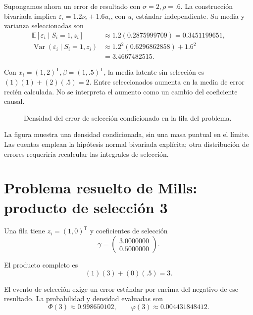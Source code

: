\documentclass[11pt,a4paper]{article}
\newcommand{\E}{\mathbb E}
\newcommand{\T}{^{\mathsf T}}
\DeclareMathOperator{\Var}{Var}
\begin{document}
Supongamos ahora un error de resultado con
\(\sigma=2,\rho=.6\).
La construcción bivariada implica
\(\varepsilon_i=1.2\nu_i+1.6u_i\),
con \(u_i\) estándar independiente.
Su media y varianza seleccionadas son
\[
\begin{aligned}
\E[\varepsilon_i\mid S_i=1,z_i]&\approx1.2(0.2875999709)
=0.3451199651,\\
\Var(\varepsilon_i\mid S_i=1,z_i)&\approx1.2^2(0.6296862858)+1.6^2\\
&=3.4667482515.\end{aligned}
\]

Con \(x_i=(1,2)\T,\beta=(1,.5)\T\),
la media latente sin selección es
\((1)(1)+(2)(.5)=2\).
Entre seleccionados aumenta en
la media de error recién calculada.
No se interpreta el aumento como
un cambio del coeficiente causal.


\begin{figure}[H]\centering
{}
\caption{Densidad del error de selección condicionado en la fila del problema.}
\end{figure}

La figura muestra una densidad condicionada,
sin una masa puntual en el límite.
Las cuentas emplean la hipótesis
normal bivariada explícita;
otra distribución de errores requeriría
recalcular las integrales de selección.

\clearpage
\section{Problema resuelto de Mills: producto de selección 3}\label{unidad82}
Una fila tiene \(z_i=(1,0)\T\)
y coeficientes de selección
\[
\gamma=\begin{pmatrix}3.0000000\\0.5000000\end{pmatrix}.
\]

El producto completo es
\[
(1)(3)+(0)(.5)=3.
\]

El evento de selección exige un error estándar
por encima del negativo de ese resultado.
La probabilidad y densidad evaluadas son
\[
\Phi(3)\approx0.998650102,\qquad\varphi(3)\approx0.004431848412.
\]
\end{document}
